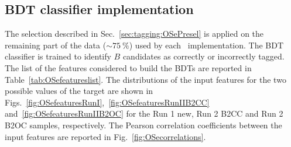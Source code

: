 
\subsection{BDT classifier implementation}
\label{sec:tagging:OSeBDT}

The selection described in Sec.~\ref{sec:tagging:OSePresel} is applied on the remaining part of the data ($\sim 75~\%$) used by each \OSe~implementation.
The BDT classifier is trained to identify $B$ candidates as correctly or incorrectly tagged. The list of the features considered to build the BDTs are reported in Table~\ref{tab:OSefeatureslist}. The distributions of the input features for the two possible values of the target are shown in Figs.~\ref{fig:OSefeaturesRunI},~\ref{fig:OSefeaturesRunIIB2CC} and~\ref{fig:OSefeaturesRunIIB2OC} for the Run 1 new, Run 2 B2CC and Run 2 B2OC samples, respectively. The Pearson correlation coefficients between the input features are reported in Fig.~\ref{fig:OSecorrelations}.

